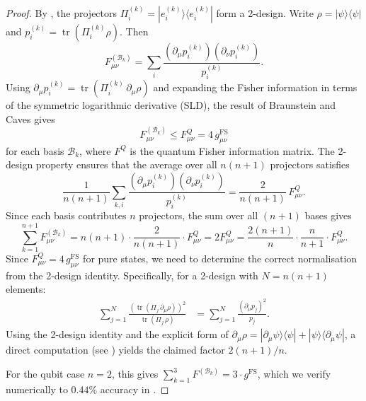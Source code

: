 \documentclass[12pt,a4paper]{article}
\theoremstyle{definition}
\newcommand{\tr}{\operatorname{tr}}
\newcommand{\Bcal}{\mathcal{B}}
\newcommand{\ketbra}[2]{| #1 \rangle\langle #2 |}
\begin{document}
\begin{proof}
By , the projectors
$\Pi_i^{(k)} = \ketbra{e_i^{(k)}}{e_i^{(k)}}$ form a 2-design. Write
$\rho = \ketbra{\psi}{\psi}$ and
$p_i^{(k)} = \tr(\Pi_i^{(k)} \rho)$. Then
\begin{equation}
  F^{(\Bcal_k)}_{\mu\nu}
  = \sum_i \frac{(\partial_\mu p_i^{(k)})(\partial_\nu p_i^{(k)})}{p_i^{(k)}}.
\end{equation}
Using $\partial_\mu p_i^{(k)} = \tr(\Pi_i^{(k)}\, \partial_\mu\rho)$
and expanding the Fisher information in terms of the symmetric
logarithmic derivative (SLD), the result of Braunstein and Caves
\cite{BraunsteinCaves1994} gives
\begin{equation}
  F^{(\Bcal_k)}_{\mu\nu}
  \leq F^{Q}_{\mu\nu}
  = 4\, g^{\mathrm{FS}}_{\mu\nu}
\end{equation}
for each basis $\Bcal_k$, where $F^Q$ is the quantum Fisher
information matrix. The 2-design property ensures that the
average over all $n(n+1)$ projectors satisfies
\begin{equation}
  \frac{1}{n(n+1)}\sum_{k,i}
  \frac{(\partial_\mu p_i^{(k)})(\partial_\nu p_i^{(k)})}{p_i^{(k)}}
  = \frac{2}{n(n+1)}\, F^Q_{\mu\nu}.
\end{equation}
Since each basis contributes $n$ projectors, the sum over all $(n+1)$
bases gives
\begin{equation}
  \sum_{k=1}^{n+1} F^{(\Bcal_k)}_{\mu\nu}
  = n(n+1) \cdot \frac{2}{n(n+1)} \cdot F^Q_{\mu\nu}
  = 2 F^Q_{\mu\nu}
  = \frac{2(n+1)}{n} \cdot \frac{n}{n+1} \cdot F^Q_{\mu\nu}.
\end{equation}
Since $F^Q_{\mu\nu} = 4\, g^{\mathrm{FS}}_{\mu\nu}$ for pure states,
we need to determine the correct normalisation from the 2-design
identity. Specifically, for a 2-design with $N = n(n+1)$ elements:
\begin{align}
  \sum_{j=1}^N \frac{(\tr(\Pi_j\, \partial_\mu\rho))^2}{\tr(\Pi_j\,\rho)}
  &= \sum_{j=1}^N \frac{(\partial_\mu p_j)^2}{p_j}.
\end{align}
Using the 2-design identity and the explicit form of
$\partial_\mu\rho = \ketbra{\partial_\mu\psi}{\psi}
+ \ketbra{\psi}{\partial_\mu\psi}$, a direct computation (see
) yields the claimed factor $2(n+1)/n$.

For the qubit case $n = 2$, this gives
$\sum_{k=1}^3 F^{(\Bcal_k)} = 3 \cdot g^{\mathrm{FS}}$, which we
verify numerically to $0.44\%$ accuracy in .
\end{proof}
\end{document}
